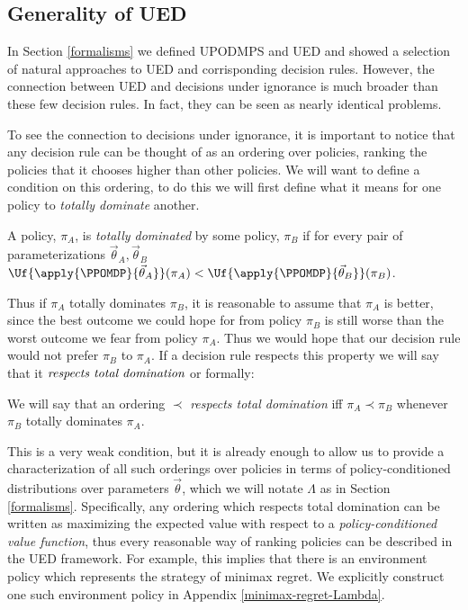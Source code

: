 \documentclass{article}
\begin{document}



\begin{appendix}



\section{Generality of UED}
\label{sec:theory}
\label{sec:universality}

In Section \ref{formalisms} we defined UPODMPS and UED and showed a selection of natural approaches to UED and corrisponding decision rules.  However, 
the connection between UED and decisions under ignorance is much broader than these few decision rules.  In fact, they can be seen as nearly identical problems. 

To see the connection to decisions under ignorance, it is important to notice that any decision rule can be thought of as an ordering over policies, ranking the policies that it chooses higher than other policies.  We will want to define a condition on this ordering, to do this we will first define what it means for one policy to \emph{totally dominate} another.

\begin{defn}
A policy, $\pi_A$, is \emph{totally dominated} by some policy, $\pi_B$ if for every pair of parameterizations $\vec{\theta}_A, \vec{\theta}_B$ $\Uf{\apply{\PPOMDP}{\vec{\theta}_A}}(\pi_A) < \Uf{\apply{\PPOMDP}{\vec{\theta}_B}}(\pi_B)$.
\end{defn} 

Thus if $\pi_A$ totally dominates $\pi_B$, it is reasonable to assume that $\pi_A$ is better, since the best outcome we could hope for from policy $\pi_B$ is still worse than the worst outcome we fear from policy $\pi_A$.  Thus we would hope that our decision rule would not prefer $\pi_B$ to $\pi_A$.  If a decision rule respects this property we will say that it $\emph{respects total domination}$ or formally:

\begin{defn}
We will say that an ordering $\prec$ \emph{respects total domination} iff $\pi_A \prec \pi_B$ whenever $\pi_B$ totally dominates $\pi_A$.
\end{defn}

This is a very weak condition, but it is already enough to allow us to provide a characterization of all such orderings over policies in terms of policy-conditioned distributions over parameters $\vec{\theta}$, which we will notate $\Lambda$ as in Section \ref{formalisms}.  Specifically, any ordering which respects total domination can be written as maximizing the expected value with respect to a \emph{policy-conditioned value function}, thus every reasonable way of ranking policies can be described in the UED framework.  For example, this implies that there is an environment policy which represents the strategy of minimax regret. We explicitly construct one such environment policy in Appendix \ref{minimax-regret-Lambda}.


\end{appendix}
\end{document}
